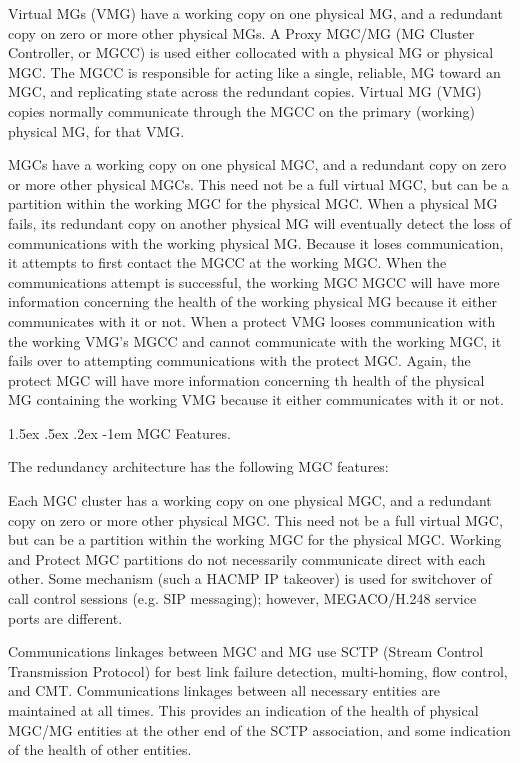 \documentclass[letterpaper,final,notitlepage,twocolumn,10pt,twoside]{article}
\makeatletter
\let\normalsize = \small
\let\small = \footnotesize
\let\footnotesize = \scriptsize
\let\scriptsize = \tiny
\renewcommand\paragraph{\@startsection{paragraph}{4}{\z@}%
                                    {1.5ex \@plus .5ex \@minus .2ex}%
                                    {-1em}%
                                    {\normalfont\normalsize\bfseries\slshape}}
\makeatother
\begin{document}
Virtual MGs (VMG) have a working copy on one physical MG, and a redundant copy
on zero or more other physical MGs.
A Proxy MGC/MG (MG Cluster Controller, or MGCC) is used either collocated with
a physical MG or physical MGC.  The MGCC is responsible for acting like a
single, reliable, MG toward an MGC, and replicating state across the redundant
copies.
Virtual MG (VMG) copies normally communicate through the MGCC on the primary
(working) physical MG, for that VMG.

MGCs have a working copy on one physical MGC, and a redundant copy on zero or
more other physical MGCs.  This need not be a full virtual MGC, but can be a
partition within the working MGC for the physical MGC.
When a physical MG fails, its redundant copy on another physical MG will
eventually detect the loss of communications with the working physical MG.
Because it loses communication, it attempts to first contact the MGCC at the
working MGC.  When the communications attempt is successful, the working MGC
MGCC will have more information concerning the health of the working physical
MG because it either communicates with it or not.
When a protect VMG looses communication with the working VMG's MGCC and cannot
communicate with the working MGC, it fails over to attempting communications
with the protect MGC.  Again, the protect MGC will have more information
concerning th health of the physical MG containing the working VMG because it
either communicates with it or not.

\paragraph{MGC Features.}

The redundancy architecture has the following MGC features:

Each MGC cluster has a working copy on one physical MGC, and a redundant copy
on zero or more other physical MGC.  This need not be a full virtual MGC, but
can be a partition within the working MGC for the physical MGC.
Working and Protect MGC partitions do not necessarily communicate direct with
each other.  Some mechanism (such a HACMP IP takeover) is used for switchover
of call control sessions (e.g. SIP messaging); however, MEGACO/H.248 service
ports are different.

Communications linkages between MGC and MG use SCTP (Stream Control
Transmission Protocol) for best link failure detection, multi-homing, flow
control, and CMT.  Communications linkages between all necessary entities are
maintained at all times.  This provides an indication of the health of
physical MGC/MG entities at the other end of the SCTP association, and some
indication of the health of other entities.
\end{document}
